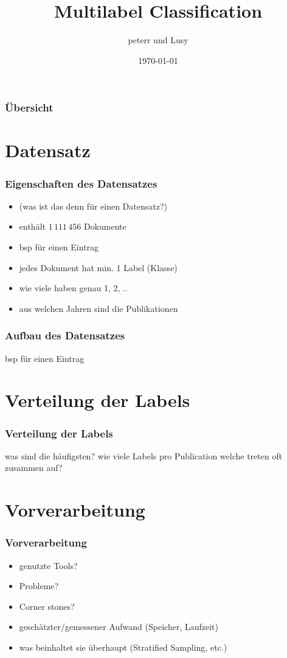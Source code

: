 \documentclass[12pt, xcolor=table]{beamer}
\begin{document}
\title{Multilabel Classification}
\author{peterr und Lusy}
\date{\today}

\begin{frame}
	\titlepage
\end{frame}

\begin{frame}
    \frametitle{Übersicht}
    \tableofcontents
\end{frame}

\section{Datensatz}
\begin{frame}
	\frametitle{Eigenschaften des Datensatzes}
	\begin{itemize}
        \item (was ist das denn für einen Datensatz?)
		\item  enthält  $1\,111\,456$ Dokumente
		\item  bsp für einen Eintrag
		\item  jedes Dokument hat min. 1 Label (Klasse)
		\item  wie viele haben genau 1, 2, ..
        \item  aus welchen Jahren sind die Publikationen
	\end{itemize}
\end{frame}

\begin{frame}
	\frametitle{Aufbau des Datensatzes}
    bsp für einen Eintrag
\end{frame}

\section{Verteilung der Labels}
\begin{frame}
	\frametitle{Verteilung der Labels}
    was sind die häufigsten?
    wie viele Labels pro Publication
    welche treten oft zusammen auf?
\end{frame}

\section{Vorverarbeitung}
\begin{frame}
	\frametitle{Vorverarbeitung}
	\begin{itemize}
		\item  genutzte Tools?
		\item  Probleme?
        \item  Corner stones?
        \item  geschätzter/gemessener Aufwand (Speicher, Laufzeit)
        \item  was beinhaltet sie überhaupt (Stratified Sampling, etc.)
	\end{itemize}
\end{frame}
\end{document}
